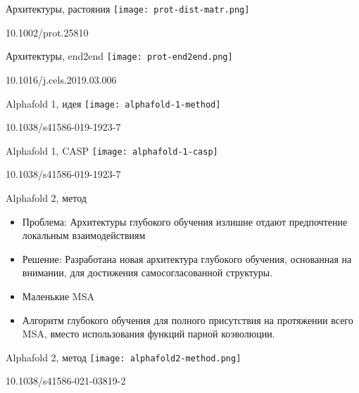 \begin{frame}{Архитектуры, растояния}
 \texttt{[image: prot-dist-matr.png]}

 \footnotesize 10.1002/prot.25810
\end{frame}

\begin{frame}{Архитектуры, end2end}
 \texttt{[image: prot-end2end.png]}

 \footnotesize 10.1016/j.cels.2019.03.006
\end{frame}

\begin{frame}
{Alphafold 1, идея}
		\texttt{[image: alphafold-1-method]}  
 
        \footnotesize 10.1038/s41586-019-1923-7
\end{frame}

\begin{frame}
{Alphafold 1, CASP }
		\texttt{[image: alphafold-1-casp]}  

        \footnotesize 10.1038/s41586-019-1923-7
\end{frame}

\begin{frame}
{Alphafold 2, метод }
\begin{itemize}
    \item Проблема: Архитектуры глубокого обучения излишне отдают предпочтение локальным взаимодействиям 
        
    \item Решение: Разработана новая архитектура глубокого обучения, основанная на внимании, для достижения самосогласованной структуры.
\end{itemize}
\begin{itemize}
\item Маленькие MSA
\item Алгоритм глубокого обучения для полного присутствия на протяжении всего MSA,
вместо использования функций парной коэволюции.
\end{itemize}
\end{frame}



\begin{frame}
{Alphafold 2, метод }
		\texttt{[image: alphafold2-method.png]}  

        \footnotesize 10.1038/s41586-021-03819-2

\end{frame}

